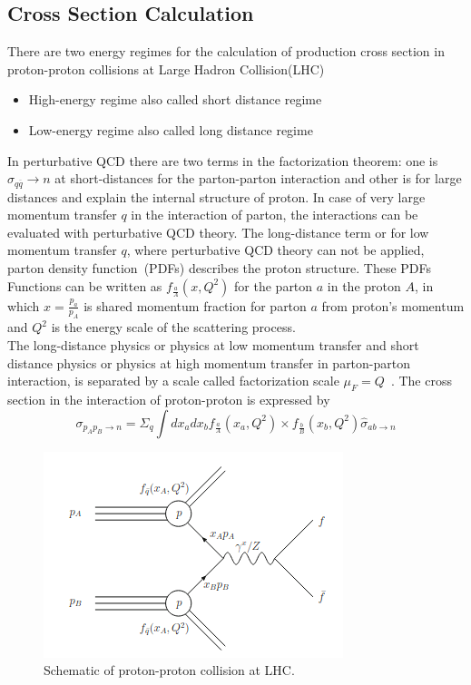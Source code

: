 \subsection{Cross Section Calculation}
There are two energy regimes for the calculation of production cross section in proton-proton collisions at Large Hadron Collision(LHC)
\begin{itemize}
\item High-energy regime also called short distance regime
\item Low-energy regime also called long distance regime
\end{itemize}
In perturbative QCD there are two terms in the factorization theorem: one is $\hat{\sigma}_{q\overline{q}}\rightarrow n$ at short-distances for the parton-parton interaction and other is for large distances and explain the internal structure of proton. In case of very large momentum transfer $q$ in the interaction of parton, the interactions can be evaluated with perturbative QCD theory. The long-distance term or for low momentum transfer $q$, where perturbative QCD theory can not be applied, parton density function~(PDFs) describes the proton structure. These PDFs Functions can be written as $f_{\frac{a}{A}}(x,Q^{2})$ for the parton $a$ in the proton $A$, in which $x=\frac{p_{a}}{p_{A}}$ is shared momentum fraction for parton $a$ from proton's momentum and $Q^{2}$ is the energy scale of the scattering process.\\
The long-distance physics or physics at low momentum transfer and short distance physics or physics at high momentum transfer in parton-parton interaction, is separated by a scale called factorization scale $\mu_{F}=Q$~\cite{Mukhi:2019yrf}.
The cross section in the interaction of proton-proton is expressed by  
\begin{equation}
\sigma_{p_{A}p_{B}\rightarrow n}=\Sigma_{q}\int dx_{a}dx_{b}f_{\frac{a}{A}}(x_{a},Q^{2})\times f_{\frac{b}{B}}(x_{b},Q^{2})\hat{\sigma}_{ab\rightarrow n}
\end{equation}   
\begin{figure}[h!]
\centering
\includegraphics[scale=0.7]{chapter3/pdf.png}
\caption{Schematic of proton-proton collision at LHC.}
\label{p-p-collision}
\end{figure}
